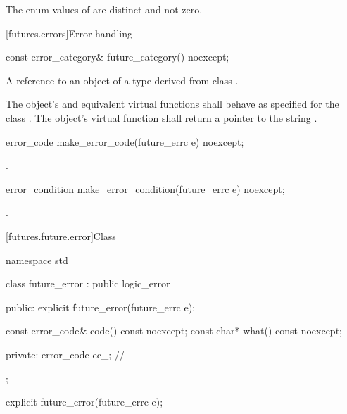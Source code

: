 \pnum
The enum values of  are distinct and not zero.

[futures.errors]{Error handling}

%
\begin{itemdecl}
const error_category& future_category() noexcept;
\end{itemdecl}

\begin{itemdescr}
\pnum
\returns
A reference to an object of a type derived from class .

\pnum
The object's  and equivalent virtual functions shall
behave as specified for the class . The object's 
virtual function shall return a pointer to the string .
\end{itemdescr}

%
\begin{itemdecl}
error_code make_error_code(future_errc e) noexcept;
\end{itemdecl}

\begin{itemdescr}
\pnum
\returns
{}.
\end{itemdescr}

%
\begin{itemdecl}
error_condition make_error_condition(future_errc e) noexcept;
\end{itemdecl}

\begin{itemdescr}
\pnum
\returns
{}.
\end{itemdescr}

[futures.future.error]{Class }

%
\begin{codeblock}
namespace std {
  class future_error : public logic_error {
  public:
    explicit future_error(future_errc e);

    const error_code& code() const noexcept;
    const char*       what() const noexcept;

  private:
    error_code ec_;             // \expos
  };
}
\end{codeblock}

%
\begin{itemdecl}
explicit future_error(future_errc e);
\end{itemdecl}

